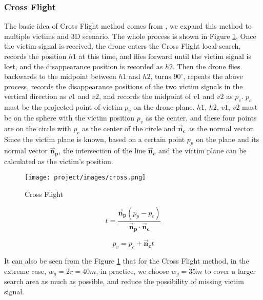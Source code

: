 \documentclass[conference]{IEEEtran}
\begin{document}
\subsubsection{Cross Flight}
The basic idea of Cross Flight method comes from \cite{doi:10.1080/19475705.2016.1238852}, we expand this method to multiple victims and 3D scenario. The whole process is shown in Figure \ref{fig:cross}, Once the victim signal is received, the drone enters the Cross Flight local search, records the position $h1$ at this time, and flies forward until the victim signal is lost, and the disappearance position is recorded as $h2$. Then the drone flies backwards to the midpoint between $h1$ and $h2$, turns $90^{\circ}$, repeats the above process, records the disappearance positions of the two victim signals in the vertical direction as $v1$ and $v2$, and records the midpoint of $v1$ and $v2$ as $p_{c}$. $p_{c}$ must be the projected point of victim $p_{v}$ on the drone plane. $h1$, $h2$, $v1$, $v2$ must be on the sphere with the victim position $p_{v}$ as the center, and these four points are on the circle with $p_{c}$ as the center of the circle and $\Vec{\mathbf{n}}_{\mathbf{c}}$ as the normal vector. Since the victim plane is known, based on a certain point $p_{p}$ on the plane and its normal vector $\Vec{\mathbf{n}}_{\mathbf{p}}$, the intersection of the line $\Vec{\mathbf{n}}_{\mathbf{c}}$ and the victim plane can be calculated as the victim's position.

\begin{figure}[h!]
    \centering
    \texttt{[image: project/images/cross.png]}
    \caption{Cross Flight}
    \label{fig:cross}
\end{figure}

\begin{equation}
t = \frac{\Vec{\mathbf{n}}_{\mathbf{p}}(p_{p} - p_{c})}{\Vec{\mathbf{n}}_{\mathbf{p}}\cdot \Vec{\mathbf{n}}_{\mathbf{c}}} \label{eq:pf}
\end{equation}

\begin{equation}
p_{v} = p_{c} + \Vec{\mathbf{n}}_{\mathbf{c}}t \label{eq:pf}
\end{equation}

It can also be seen from the Figure \ref{fig:cross} that for the Cross Flight method, in the extreme case, $w_{g} = 2r=40m$, in practice, we choose $w_{g} = 35m$ to cover a larger search area as much as possible, and reduce the possibility of missing victim signal.
\end{document}
